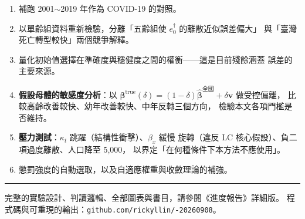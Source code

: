 \documentclass[UTF8, fontset=macnew, a4paper, 12pt]{ctexart}
\newcommand{\edag}{e_0^{\dagger}}
\begin{document}
\begin{enumerate}[leftmargin=*]
  \item 補跑 2001$\sim$2019 年作為 COVID-19 的對照。
  \item 以單齡組資料重新檢驗，分離「五齡組使 $\edag$ 的離散近似誤差偏大」
        與「臺灣死亡轉型較快」兩個競爭解釋。
  \item 量化初始值選擇在準確度與穩健度之間的權衡——這是目前殘餘涵蓋
        誤差的主要來源。
  \item \textbf{假設母體的敏感度分析}：以
        $\boldsymbol{\beta}^{\text{true}}(\delta)=(1-\delta)
        \hat{\boldsymbol{\beta}}^{\text{全國}}+\delta\mathbf{v}$ 做受控偏離，
        比較高齡改善較快、幼年改善較快、中年反轉三個方向，
        檢驗本文各項門檻是否維持。
  \item \textbf{壓力測試}：$\kappa_t$ 跳躍（結構性衝擊）、$\beta_x$ 緩慢
        旋轉（違反 LC 核心假設）、負二項過度離散、人口降至 5,000，
        以界定「在何種條件下本方法不應使用」。
  \item 懲罰強度的自動選取，以及自適應權重與收斂理論的補強。
\end{enumerate}

\vspace{8pt}
\hrule
\vspace{6pt}
\noindent\small
完整的實驗設計、判讀邏輯、全部圖表與書目，請參閱《進度報告》詳細版。
程式碼與可重現的輸出：\texttt{github.com/rickyllin/-20260908}。
\end{document}
